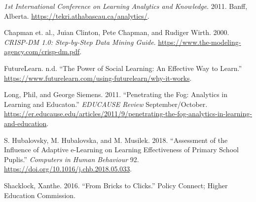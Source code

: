 \documentclass[
]{article}
\newlength{\cslhangindent}
\newlength{\cslentryspacingunit} %
\newenvironment{CSLReferences}[2] %
 {%
  \setlength{\parindent}{0pt}
  \ifodd #1
  \let\oldpar\par
  \def\par{\hangindent=\cslhangindent\oldpar}
  \fi
  \setlength{\parskip}{#2\cslentryspacingunit}
 }%
 {}
\begin{document}
\hypertarget{refs}{}
\begin{CSLReferences}{1}{0}
\leavevmode{}%
\emph{1st International Conference on Learning Analytics and Knowledge}.
2011. Banff, Alberta. \url{https://tekri.athabascau.ca/analytics/}.

\leavevmode{}%
Chapman et. al., Juian Clinton, Pete Chapman, and Rudiger Wirth. 2000.
\emph{CRISP-DM 1.0: Step-by-Step Data Mining Guide}.
\url{https://www.the-modeling-agency.com/crisp-dm.pdf}.

\leavevmode{}%
FutureLearn. n.d. {``The Power of Social Learning: An Effective Way to
Learn.''}
\url{https://www.futurelearn.com/using-futurelearn/why-it-works}.

\leavevmode{}%
Long, Phil, and George Siemens. 2011. {``Penetrating the Fog: Analytics
in Learning and Educaton.''} \emph{EDUCAUSE Review} September/October.
\url{https://er.educause.edu/articles/2011/9/penetrating-the-fog-analytics-in-learning-and-education}.

\leavevmode{}%
S. Hubalovsky, M. Hubalovska, and M. Musilek. 2018. {``Assessment of the
Influence of Adaptive e-Learning on Learning Effectiveness of Primary
School Puplis.''} \emph{Computers in Human Behaviour} 92.
\url{https://doi.org/10.1016/j.chb.2018.05.033}.

\leavevmode{}%
Shacklock, Xanthe. 2016. {``From Bricks to Clicks.''} {Policy Connect};
{Higher Education Commission}.

\end{CSLReferences}
\end{document}
